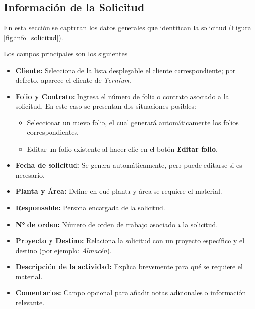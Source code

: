 \subsection{Información de la Solicitud}

En esta sección se capturan los datos generales que identifican la solicitud (Figura \ref{fig:info_solicitud}).  

Los campos principales son los siguientes:

\begin{itemize}
    \item \textbf{Cliente:} Selecciona de la lista desplegable el cliente correspondiente; por defecto, aparece el cliente de \textit{Ternium}.
    \item \textbf{Folio y Contrato:} Ingresa el número de folio o contrato asociado a la solicitud.  
    En este caso se presentan dos situaciones posibles:
    \begin{itemize}
        \item Seleccionar un nuevo folio, el cual generará automáticamente los folios correspondientes.
        \item Editar un folio existente al hacer clic en el botón \textbf{Editar folio}.
    \end{itemize}
    \item \textbf{Fecha de solicitud:} Se genera automáticamente, pero puede editarse si es necesario.
    \item \textbf{Planta y Área:} Define en qué planta y área se requiere el material.
    \item \textbf{Responsable:} Persona encargada de la solicitud.
    \item \textbf{N° de orden:} Número de orden de trabajo asociado a la solicitud.
    \item \textbf{Proyecto y Destino:} Relaciona la solicitud con un proyecto específico y el destino (por ejemplo: \textit{Almacén}).
    \item \textbf{Descripción de la actividad:} Explica brevemente para qué se requiere el material.
    \item \textbf{Comentarios:} Campo opcional para añadir notas adicionales o información relevante.
\end{itemize}

